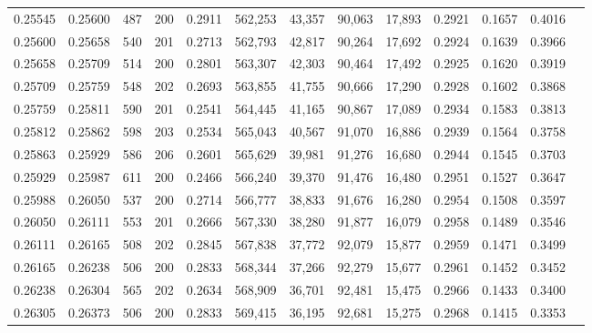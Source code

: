 \begin{tabular}{rrrrrrrrrrrrr}
0.25545 & 0.25600 &   487 & 200 &                                     0.2911 & 562,253 &  43,357 &  90,063 &  17,893 & 0.2921 & 0.1657 & 0.4016 \\
0.25600 & 0.25658 &   540 & 201 &                                     0.2713 & 562,793 &  42,817 &  90,264 &  17,692 & 0.2924 & 0.1639 & 0.3966 \\
0.25658 & 0.25709 &   514 & 200 &                                     0.2801 & 563,307 &  42,303 &  90,464 &  17,492 & 0.2925 & 0.1620 & 0.3919 \\
0.25709 & 0.25759 &   548 & 202 &                                     0.2693 & 563,855 &  41,755 &  90,666 &  17,290 & 0.2928 & 0.1602 & 0.3868 \\
0.25759 & 0.25811 &   590 & 201 &                                     0.2541 & 564,445 &  41,165 &  90,867 &  17,089 & 0.2934 & 0.1583 & 0.3813 \\
0.25812 & 0.25862 &   598 & 203 &                                     0.2534 & 565,043 &  40,567 &  91,070 &  16,886 & 0.2939 & 0.1564 & 0.3758 \\
0.25863 & 0.25929 &   586 & 206 &                                     0.2601 & 565,629 &  39,981 &  91,276 &  16,680 & 0.2944 & 0.1545 & 0.3703 \\
0.25929 & 0.25987 &   611 & 200 &                                     0.2466 & 566,240 &  39,370 &  91,476 &  16,480 & 0.2951 & 0.1527 & 0.3647 \\
0.25988 & 0.26050 &   537 & 200 &                                     0.2714 & 566,777 &  38,833 &  91,676 &  16,280 & 0.2954 & 0.1508 & 0.3597 \\
0.26050 & 0.26111 &   553 & 201 &                                     0.2666 & 567,330 &  38,280 &  91,877 &  16,079 & 0.2958 & 0.1489 & 0.3546 \\
0.26111 & 0.26165 &   508 & 202 &                                     0.2845 & 567,838 &  37,772 &  92,079 &  15,877 & 0.2959 & 0.1471 & 0.3499 \\
0.26165 & 0.26238 &   506 & 200 &                                     0.2833 & 568,344 &  37,266 &  92,279 &  15,677 & 0.2961 & 0.1452 & 0.3452 \\
0.26238 & 0.26304 &   565 & 202 &                                     0.2634 & 568,909 &  36,701 &  92,481 &  15,475 & 0.2966 & 0.1433 & 0.3400 \\
0.26305 & 0.26373 &   506 & 200 &                                     0.2833 & 569,415 &  36,195 &  92,681 &  15,275 & 0.2968 & 0.1415 & 0.3353 \\

\end{tabular}
